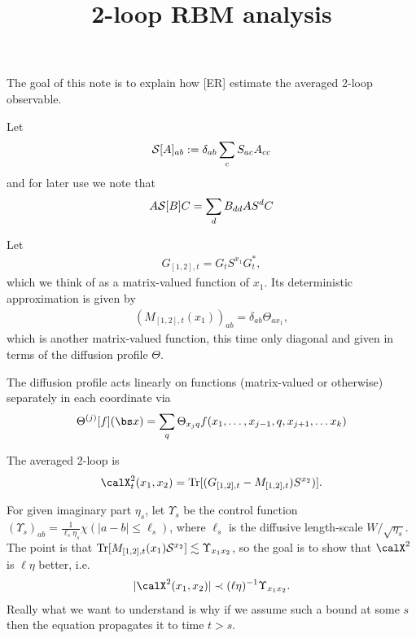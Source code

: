 \documentclass[11pt]{amsart}
\title{2-loop RBM analysis}
\begin{document}
\maketitle
The goal of this note is to explain how [ER] estimate the averaged 2-loop observable.

Let 
\begin{align*}
\mathcal{S}[A]_{ab} := \delta_{ab} \sum_{c} S_{ac} A_{cc}
\end{align*}
and for later use we note that
\begin{align*}
A \mathcal{S}[B] C = \sum_{d} B_{dd} A S^{d} C
\end{align*}

Let
\begin{align*}
G_{[1,2],t} = G_t S^{x_1} G_t^*,
\end{align*}
which we think of as a matrix-valued function of $x_1$.
Its deterministic approximation is given by
\begin{align*}
(M_{[1,2],t}(x_1))_{ab} = \delta_{ab}\Theta_{ax_1},
\end{align*}
which is another matrix-valued function, this time only diagonal and given in terms of the diffusion profile $\Theta$.

The diffusion profile acts linearly on functions (matrix-valued or otherwise) separately in each coordinate via
\begin{align*}
\Theta^{(j)}[f](\bs x) = \sum_{q} \Theta_{x_j q} f(x_1,\ldots,x_{j-1},q,x_{j+1},\ldots x_k)
\end{align*}

The averaged 2-loop is 
\begin{align*}
\calX^{2}_t(x_1,x_2) = \Tr[(G_{[1,2],t} - M_{[1,2],t}) S^{x_{2}})].
\end{align*}

For given imaginary part $\eta_s$, let $\Upsilon_s$ be the control function $(\Upsilon_s)_{ab} = \frac{1}{\ell_s \eta_s}\chi(|a-b|\leq \ell_s)$, where $\ell_s$ is the diffusive length-scale $W/\sqrt{\eta_s} $.
The point is that $\operatorname{Tr}[M_{[1,2],t}(x_1)\mathcal{S}^{x_2}]\lesssim \Upsilon_{x_1x_2}$, so the goal is to show that
$\calX^{2}$ is $\ell \eta$ better, i.e.
\begin{align*}
|\calX^{2}(x_1,x_2)| \prec (\ell \eta)^{-1} \Upsilon_{x_1x_2}.
\end{align*}
Really what we want to understand is why if we assume such a bound at some $s$ then the equation propagates it to time $t>s$. 
\end{document}
